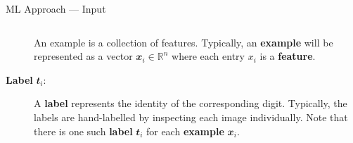 \documentclass{bredelebeamer}
\begin{document}
\begin{frame}{ML Approach --- Input}
\begin{columns}
\begin{column}{0.8\textwidth}
\begin{description}
\begin{justify}
              An example is a collection of features. Typically, an
              \textbf{example} will be represented as a vector
              $\mathbfit{x}_i \in \mathbb{R}^n$ where each entry $x_i$ is a
              \textbf{feature}.
            \end{justify}
          \item [\textbf{Label} $\mathbfit{t}_i$:]
            \begin{justify}
              A \textbf{label} represents the identity of the corresponding
              digit. Typically, the labels are hand-labelled by inspecting
              each image individually. Note that there is one such
              \textbf{label} $\mathbfit{t}_i$ for each \textbf{example}
              $\mathbfit{x}_i$.
            \end{justify}
        \end{description}
      \end{column}
  \end{columns}
\end{frame}
\end{document}
